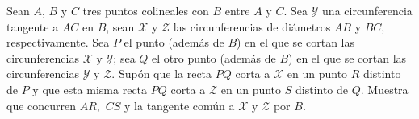 Sean $A$, $B$ y $C$ tres puntos colineales con $B$ entre $A$ y $C$. Sea $\mathcal{Y}$ una circunferencia tangente a $AC$ en $B$, sean $\mathcal{X}$ y $\mathcal{Z}$ las circunferencias de diámetros $AB$ y $BC$, respectivamente. Sea $P$ el punto (además de $B$) en el que se cortan las circunferencias $\mathcal{X}$ y $\mathcal{Y}$; sea $Q$ el otro punto (además de $B$) en el que se cortan las circunferencias $\mathcal{Y}$ y $\mathcal{Z}$. Supón que la recta $PQ$ corta a $\mathcal{X}$ en un punto $R$ distinto de $P$ y que esta misma recta $PQ$ corta a $\mathcal{Z}$ en un punto $S$ distinto de $Q$. Muestra que concurren $AR,$ $CS$ y la tangente común a $\mathcal{X}$ y $\mathcal{Z}$ por $B$.